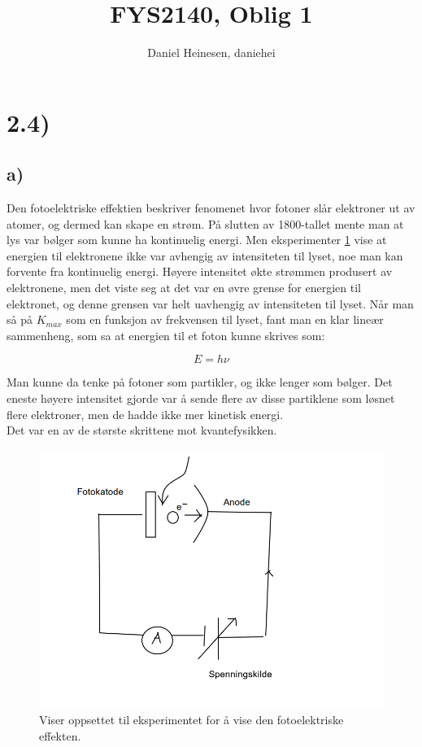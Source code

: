 \documentclass[a4paper,norsk, 10pt]{article}
\title{FYS2140, Oblig 1}
\author{Daniel Heinesen, daniehei}
\begin{document}
\maketitle

\section*{2.4)}

\subsection*{a)}
Den fotoelektriske effektien beskriver fenomenet hvor fotoner slår elektroner ut av atomer, og dermed kan skape en strøm. På slutten av 1800-tallet mente man at lys var bølger som kunne ha kontinuelig energi. Men eksperimenter \ref{fig::fotoele} vise at energien til elektronene ikke var avhengig av intensiteten til lyset, noe man kan forvente fra kontinuelig energi. Høyere intensitet økte strømmen produsert av elektronene, men det viste seg at det var en øvre grense for energien til elektronet, og denne grensen var helt uavhengig av intensiteten til lyset. Når man så på $K_{max}$ som en funksjon av frekvensen til lyset, fant man en klar lineær sammenheng, som sa at energien til et foton kunne skrives som:

$$
E = h\nu
$$

Man kunne da tenke på fotoner som partikler, og ikke lenger som bølger. Det eneste høyere intensitet gjorde var å sende flere av disse partiklene som løsnet flere elektroner, men de hadde ikke mer kinetisk energi.\\

Det var en av de største skrittene mot kvantefysikken.



\begin{figure}[H]
\centering
\includegraphics[scale=0.4]{fotoel.png}
\caption{Viser oppsettet til eksperimentet for å vise den fotoelektriske effekten.}\label{fig::fotoele}
\end{figure}
\end{document}
